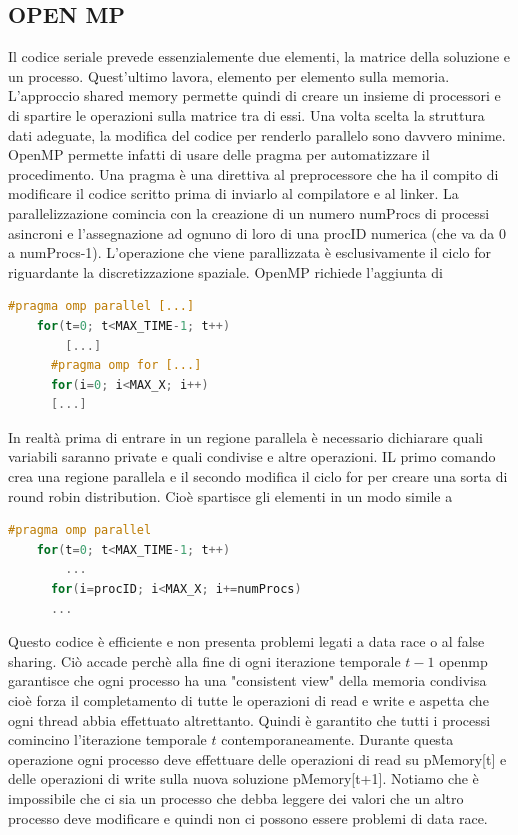 \documentclass[italian]{article}
\begin{document}
\subsection{OPEN MP}
Il codice seriale prevede essenzialemente due elementi, la matrice della soluzione e un processo. Quest'ultimo lavora, elemento per elemento sulla memoria. L'approccio shared memory permette quindi di creare un insieme di processori e di spartire le operazioni sulla matrice tra di essi. Una volta scelta la struttura dati adeguate, la modifica del codice per renderlo parallelo sono davvero minime. OpenMP permette infatti di usare delle pragma per automatizzare il procedimento. Una pragma è una direttiva al preprocessore che ha il compito di modificare il codice scritto prima di inviarlo al compilatore e al linker. La parallelizzazione comincia con la creazione di un numero numProcs di processi asincroni e l'assegnazione ad ognuno di loro di una procID numerica (che va da 0 a numProcs-1). L'operazione che viene parallizzata è esclusivamente il ciclo for riguardante la discretizzazione spaziale. OpenMP richiede l'aggiunta di
\begin{lstlisting}[language=C++]
#pragma omp parallel [...]
    for(t=0; t<MAX_TIME-1; t++)
	  	[...]
      #pragma omp for [...]
      for(i=0; i<MAX_X; i++)
      [...]
\end{lstlisting}
In realtà prima di entrare in un regione parallela è necessario dichiarare quali variabili saranno private e quali condivise e altre operazioni. IL primo comando crea una regione parallela e il secondo modifica il ciclo for per creare una sorta di round robin distribution. Cioè spartisce gli elementi in un modo simile a
\begin{lstlisting}[language=C++]
#pragma omp parallel
    for(t=0; t<MAX_TIME-1; t++)
	  	...
      for(i=procID; i<MAX_X; i+=numProcs)
      ...
\end{lstlisting}
Questo codice è efficiente e non presenta problemi legati a data race o al false sharing. Ciò accade perchè alla fine di ogni iterazione temporale $t-1$ openmp garantisce che ogni processo ha una "consistent view" della memoria condivisa cioè forza il completamento di tutte le operazioni di read e write e aspetta che ogni thread abbia effettuato altrettanto. Quindi è garantito che tutti i processi comincino l'iterazione temporale $t$ contemporaneamente. Durante questa operazione ogni processo deve effettuare delle operazioni di read su pMemory[t] e delle operazioni di write sulla nuova soluzione pMemory[t+1]. Notiamo che è impossibile che ci sia un processo che debba leggere dei valori che un altro processo deve modificare e quindi non ci possono essere problemi di data race.
\end{document}

